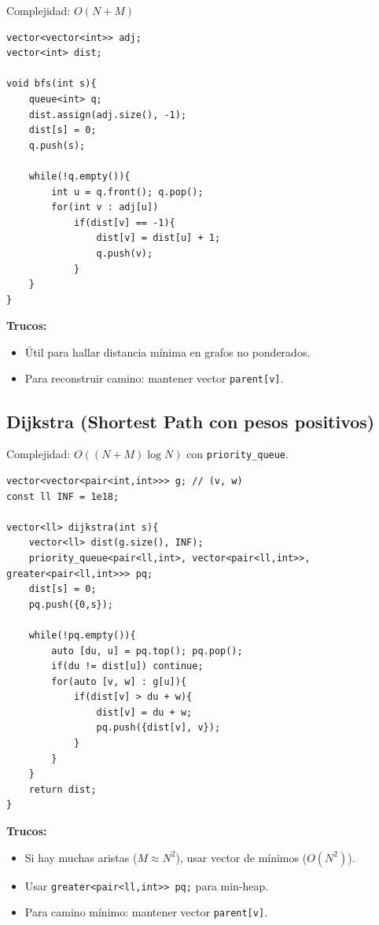 \documentclass{article}
\begin{document}
Complejidad: \(O(N + M)\)

\begin{lstlisting}[style=cppstyle]
vector<vector<int>> adj;
vector<int> dist;

void bfs(int s){
    queue<int> q;
    dist.assign(adj.size(), -1);
    dist[s] = 0;
    q.push(s);

    while(!q.empty()){
        int u = q.front(); q.pop();
        for(int v : adj[u])
            if(dist[v] == -1){
                dist[v] = dist[u] + 1;
                q.push(v);
            }
    }
}
\end{lstlisting}

\textbf{Trucos:}
\begin{itemize}
  \item Útil para hallar distancia mínima en grafos no ponderados.
  \item Para reconstruir camino: mantener vector \lstinline|parent[v]|.
\end{itemize}


\subsection{Dijkstra (Shortest Path con pesos positivos)}

Complejidad: \(O((N + M) \log N)\) con \lstinline|priority_queue|.

\begin{lstlisting}[style=cppstyle]
vector<vector<pair<int,int>>> g; // (v, w)
const ll INF = 1e18;

vector<ll> dijkstra(int s){
    vector<ll> dist(g.size(), INF);
    priority_queue<pair<ll,int>, vector<pair<ll,int>>, greater<pair<ll,int>>> pq;
    dist[s] = 0;
    pq.push({0,s});

    while(!pq.empty()){
        auto [du, u] = pq.top(); pq.pop();
        if(du != dist[u]) continue;
        for(auto [v, w] : g[u]){
            if(dist[v] > du + w){
                dist[v] = du + w;
                pq.push({dist[v], v});
            }
        }
    }
    return dist;
}
\end{lstlisting}

\textbf{Trucos:}
\begin{itemize}
  \item Si hay muchas aristas (\(M \approx N^2\)), usar vector de mínimos (\(O(N^2)\)).
  \item Usar \lstinline|greater<pair<ll,int>> pq;| para min-heap.
  \item Para camino mínimo: mantener vector \lstinline|parent[v]|.
\end{itemize}
\end{document}
